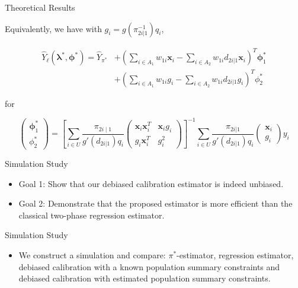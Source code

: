 \documentclass{beamer} %
\renewcommand{\bf}[1]{\mathbf{#1}}
\begin{document}
\begin{frame}{Theoretical Results}
  
  Equivalently, we have with $g_i = g(\pi_{2i |1}^{-1}) q_i$, 

  \begin{align*}
   \hat Y_{\ell}(\bm \lambda^*, \bm \phi^*) 
   = \hat{Y}_{\pi^*} &+ 
   \left(\sum_{i \in A_1} w_{1i} \bf x_i  -  \sum_{i \in A_2} w_{1i} d_{2i|1}
   \bf x_i  \right)^T \bm \phi_1^* \\
   &+ \left(\sum_{i \in A_1} w_{1i} g_i  -
   \sum_{i \in A_2} w_{1i} d_{2i|1}g_i  \right)^T \phi_2^*  
  \end{align*}

  for 

  $$\begin{pmatrix}
  \bm \phi_1^* \\
  \phi_2^* 
  \end{pmatrix}
  = \left[ \sum_{i \in U} \frac{\pi_{2i \mid 1} }{ g'(d_{2i | 1}) q_i}
  \begin{pmatrix}
    \bf x_i \bf x_i^T &   \bf x_i g_i   \\
    g_i \bf x_i^T   & g_i^2     
  \end{pmatrix} \right]^{-1}
  \sum_{i \in U} \frac{\pi_{2i|1}}{ g'(d_{2i | 1}) q_i}
  \begin{pmatrix}
    \bf x_i \\ g_i
  \end{pmatrix}y_i $$

\end{frame}


\begin{frame}{Simulation Study}

  \begin{itemize}
    \item Goal 1: Show that our debiased calibration estimator is indeed unbiased.
    \item Goal 2: Demonstrate that the proposed estimator is more efficient than
      the classical two-phase regression estimator.
  \end{itemize}

\end{frame}

\begin{frame}{Simulation Study}

  \begin{itemize}
    \item We construct a simulation and compare: $\pi^*$-estimator, regression
      estimator, debiased calibration with a known population summary
      constraints and debiased calibration with estimated population summary
      constraints.
  \end{itemize}

\end{frame}
\end{document}
